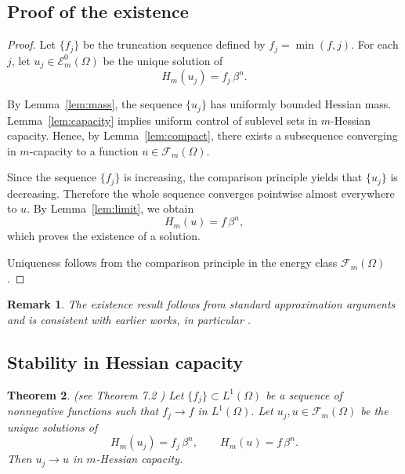 \documentclass[10pt,a4paper]{amsart}
\newtheorem{theorem}{Theorem}[section]
\newtheorem{remark}[theorem]{Remark}
\begin{document}
	
	\subsection{Proof of the existence}
	
	\begin{proof}
		Let $\{f_j\}$ be the truncation sequence defined by
		$f_j = \min(f,j)$.
		For each $j$, let $u_j \in \mathcal{E}_m^0(\Omega)$ be the unique solution of
		\[
		H_m(u_j) = f_j \, \beta^n.
		\]
		
		By Lemma~\ref{lem:mass}, the sequence $\{u_j\}$ has uniformly bounded Hessian mass.
		Lemma~\ref{lem:capacity} implies uniform control of sublevel sets in $m$-Hessian capacity.
		Hence, by Lemma~\ref{lem:compact}, there exists a subsequence converging in $m$-capacity to a function
		$u \in \mathcal{F}_m(\Omega)$.
		
		Since the sequence $\{f_j\}$ is increasing, the comparison principle yields that $\{u_j\}$ is decreasing.
		Therefore the whole sequence converges pointwise almost everywhere to $u$.
		By Lemma~\ref{lem:limit}, we obtain
		\[
		H_m(u) = f \, \beta^n,
		\]
		which proves the existence of a solution.
		
		Uniqueness follows from the comparison principle in the energy class $\mathcal{F}_m(\Omega)$.
	\end{proof}
	
	
\begin{remark}
	The existence result follows from standard approximation arguments
	and is consistent with earlier works, in particular \cite{Lu}.
\end{remark}
\subsection{Stability in Hessian capacity}



\begin{theorem}\label{thm:stability}(see Theorem 7.2 \cite{V T Nguyen})
	Let $\{f_j\} \subset L^1(\Omega)$ be a sequence of nonnegative functions such that
	$f_j \to f$ in $L^1(\Omega)$.
	Let $u_j, u \in \mathcal{F}_m(\Omega)$ be the unique solutions of
	\[
	H_m(u_j) = f_j \, \beta^n,
	\qquad
	H_m(u) = f \, \beta^n.
	\]
	Then $u_j \to u$ in $m$-Hessian capacity.
\end{theorem}
\end{document}
